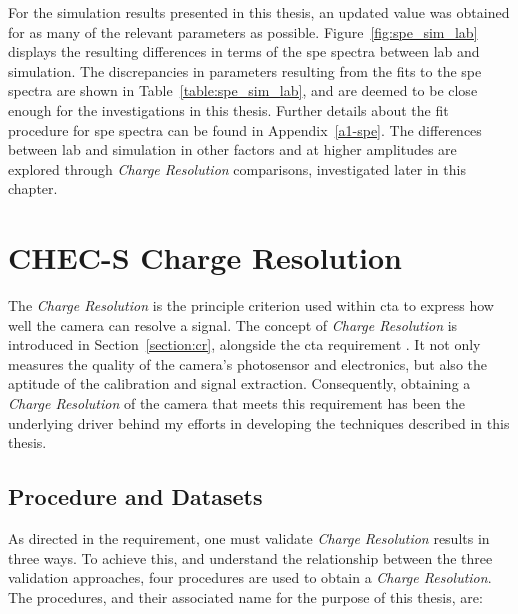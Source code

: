 For the simulation results presented in this thesis, an updated value was obtained for as many of the relevant  parameters as possible. Figure~\ref{fig:spe_sim_lab} displays the resulting differences in terms of the \gls{spe} spectra between lab and simulation. The discrepancies in parameters resulting from the fits to the \gls{spe} spectra are shown in Table~\ref{table:spe_sim_lab}, and are deemed to be close enough for the investigations in this thesis. Further details about the fit procedure for \gls{spe} spectra can be found in Appendix~\ref{a1-spe}. The differences between lab and simulation in other factors and at higher amplitudes are explored through \textit{Charge Resolution} comparisons, investigated later in this chapter.

\section{CHEC-S Charge Resolution}

The \textit{Charge Resolution} is the principle criterion used within \gls{cta} to express how well the camera can resolve a signal. The concept of \textit{Charge Resolution} is introduced in Section~\ref{section:cr}, alongside the \gls{cta} requirement . It not only measures the quality of the camera's photosensor and electronics, but also the aptitude of the calibration and signal extraction. Consequently, obtaining a \textit{Charge Resolution} of the camera that meets this requirement has been the underlying driver behind my efforts in developing the techniques described in this thesis.

\subsection{Procedure and Datasets} \label{section:crprocedure}

As directed in the  requirement, one must validate \textit{Charge Resolution} results in three ways. To achieve this, and understand the relationship between the three validation approaches, four procedures are used to obtain a \textit{Charge Resolution}. The procedures, and their associated name for the purpose of this thesis, are:


